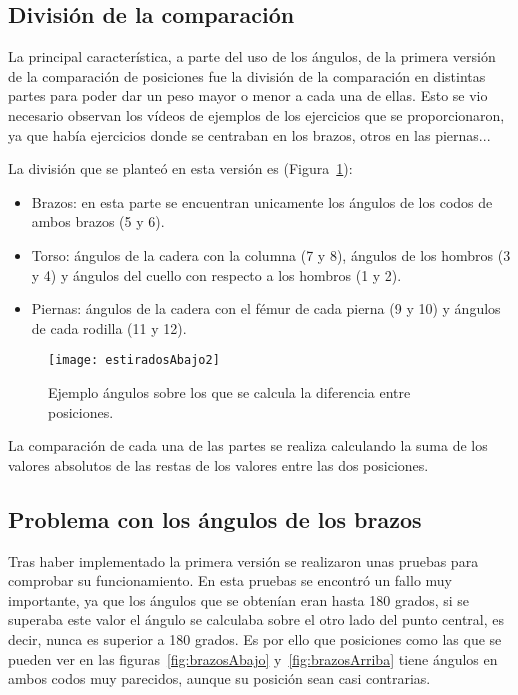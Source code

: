 \subsection{División de la comparación}
La principal característica, a parte del uso de los ángulos, de la primera versión de la comparación de posiciones fue la división de la comparación en distintas partes para poder dar un peso mayor o menor a cada una de ellas. Esto se vio necesario observan los vídeos de ejemplos de los ejercicios que se proporcionaron, ya que había ejercicios donde se centraban en los brazos, otros en las piernas...

La división que se planteó en esta versión es (Figura~\ref{fig:estiradosAbajo2}):
\begin{itemize}
	\item Brazos: en esta parte se encuentran unicamente los ángulos de los codos de ambos brazos (5 y 6).
	\item Torso: ángulos de la cadera con la columna (7 y 8), ángulos de los hombros (3 y 4) y ángulos del cuello con respecto a los hombros (1 y 2).
	\item Piernas: ángulos de la cadera con el fémur de cada pierna (9 y 10) y ángulos de cada rodilla (11 y 12).
\end{itemize}

\begin{figure}[h]
	\centering
	\texttt{[image: estiradosAbajo2]}
	\caption{Ejemplo ángulos sobre los que se calcula la diferencia entre posiciones.}
	\label{fig:estiradosAbajo2}
\end{figure}

La comparación de cada una de las partes se realiza calculando la suma de los valores absolutos de las restas de los valores entre las dos posiciones.

\subsection{Problema con los ángulos de los brazos}
Tras haber implementado la primera versión se realizaron unas pruebas para comprobar su funcionamiento. En esta pruebas se encontró un fallo muy importante, ya que los ángulos que se obtenían eran hasta 180 grados, si se superaba este valor el ángulo se calculaba sobre el otro lado del punto central, es decir, nunca es superior a 180 grados. Es por ello que  posiciones como las que se pueden ver en las figuras~\ref{fig:brazosAbajo} y~\ref{fig:brazosArriba} tiene ángulos en ambos codos muy parecidos, aunque su posición sean casi contrarias.

